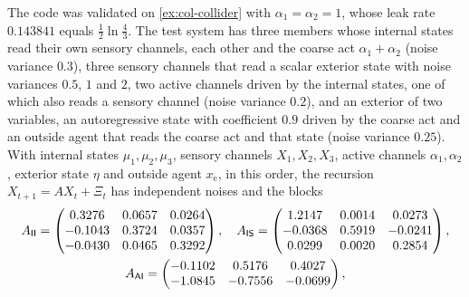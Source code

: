 \begin{numcheck}\label{chk:met-blanket}
The code was validated on \cref{ex:col-collider} with $\alpha_1=\alpha_2=1$, whose leak rate $0.143841$ equals $\frac12\ln\frac43$. The test system has three members whose internal states read their own sensory channels, each other and the coarse act $\alpha_1+\alpha_2$ (noise variance $0.3$), three sensory channels that read a scalar exterior state with noise variances $0.5$, $1$ and $2$, two active channels driven by the internal states, one of which also reads a sensory channel (noise variance $0.2$), and an exterior of two variables, an autoregressive state with coefficient $0.9$ driven by the coarse act and an outside agent that reads the coarse act and that state (noise variance $0.25$). With internal states $\mu_1,\mu_2,\mu_3$, sensory channels $X_1,X_2,X_3$, active channels $\alpha_1,\alpha_2$, exterior state $\eta$ and outside agent $x_{\mathrm e}$, in this order, the recursion $X_{t+1}=AX_t+\Xi_t$ has independent noises and the blocks
\begin{gather*}
A_{\mathsf{I}\mathsf{I}}=\begin{pmatrix}0.3276&0.0657&0.0264\\-0.1043&0.3724&0.0357\\-0.0430&0.0465&0.3292\end{pmatrix},\quad
A_{\mathsf{I}\mathsf{S}}=\begin{pmatrix}1.2147&0.0014&0.0273\\-0.0368&0.5919&-0.0241\\0.0299&0.0020&0.2854\end{pmatrix},\\
A_{\mathsf{A}\mathsf{I}}=\begin{pmatrix}-0.1102&0.5176&0.4027\\-1.0845&-0.7556&-0.0699\end{pmatrix},
\end{gather*}

\end{numcheck}
